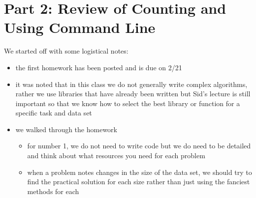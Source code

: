 \section{Part 2: Review of Counting and Using Command Line}
We started off with some logistical notes:
\begin{itemize}
    \item the first homework has been posted and is due on 2/21
    \item it was noted that in this class we do not generally write complex algorithms, rather we use libraries that have already been written but Sid's lecture is still important so that we know how to select the best library or function for a specific task and data set
    \item we walked through the homework
    \begin{itemize}
        \item for number 1, we do not need to write code but we do need to be detailed and think about what resources you need for each problem
        \item when a problem notes changes in the size of the data set, we should try to find the practical solution for each size rather than just using the fanciest methods for each 
    \end{itemize}
\end{itemize}

